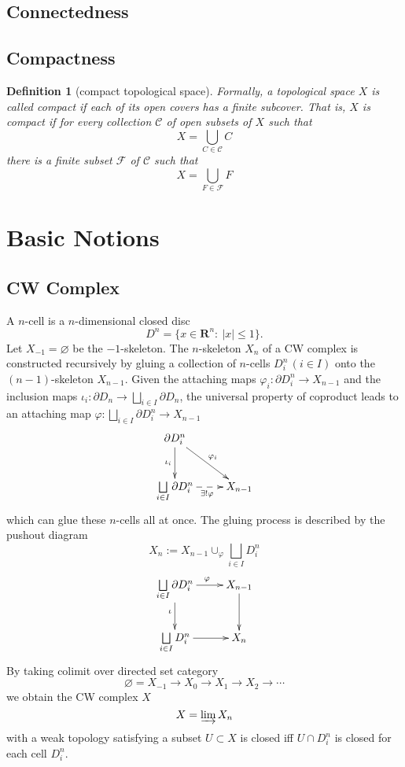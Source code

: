 \documentclass{report}
\newtheorem{definition}{Definition}[section]
\theoremstyle{nonumberplain}
\begin{document}
\section{Connectedness}

\section{Compactness}
\begin{definition}[compact topological space]
	Formally, a topological space $X$ is called \emph{compact} if each of its open covers has a finite subcover. That is, $X$ is compact if for every collection $\mathcal{C}$ of open subsets of $X$ such that
	\[
		X=\bigcup_{C \in \mathcal{C}} C
	\]
	there is a finite subset $\mathcal{F}$ of $\mathcal{C}$ such that
	\[
		X=\bigcup_{F \in \mathcal{F}} F
	\]
\end{definition}

\chapter{Basic Notions}
\section{CW Complex}
A $n$-cell is a $n$-dimensional closed disc
\[
	D^n=\{x\in\mathbf{R}^n:\ |x|\le 1\}.
\]
Let $X_{-1}=\varnothing$ be the $-1$-skeleton. The $n$-skeleton $X_n$ of a CW complex is constructed recursively by gluing a collection of $n$-cells $D^n_i\,(i\in I)$ onto the $(n-1)$-skeleton $X_{n-1}$. Given the attaching maps $\varphi_i:\partial D^n_i\to X_{n-1}$ and the inclusion maps $\iota_i:\partial D_n\to \bigsqcup\limits_{i\in I}\partial D_n$, the universal property of coproduct leads to an attaching map $\varphi:\bigsqcup\limits_{i\in I}\partial D^n_i\to X_{n-1}$  
\[\xymatrix{
	\partial D^n_i\ar[rd]^{\varphi_i}\ar[d]_{\iota_i}&\\
	\bigsqcup\limits_{i\in I}\partial D^n_i\ar@{-->}[r]_{\exists!\varphi} &X_{n-1}
		}\]
which can glue these $n$-cells all at once. The gluing process is described by the pushout diagram
\[
	X_{n}:=X_{n-1}\cup_{\varphi}\bigsqcup\limits_{i\in I} D^n_i
\]
\[\xymatrix{
	\bigsqcup\limits_{i\in I}\partial D^n_i\ar[r]^{\varphi}\ar[d]_{\iota}  &X_{n-1}\ar[d]_{}\\
	\bigsqcup\limits_{i\in I} D^n_i\ar@{->}[r]_{}&X_{n}
		}\]
By taking colimit over directed set category
$$
\varnothing=X_{-1} \rightarrow X_0 \rightarrow X_1 \rightarrow X_2 \rightarrow \cdots
$$
we obtain the CW complex $X$
\[
	X=\varinjlim X_n
\]
with a weak topology satisfying a subset $U \subset X$ is closed iff $U \cap D^n_i$ is closed for each cell $D^n_i$.
\end{document}
